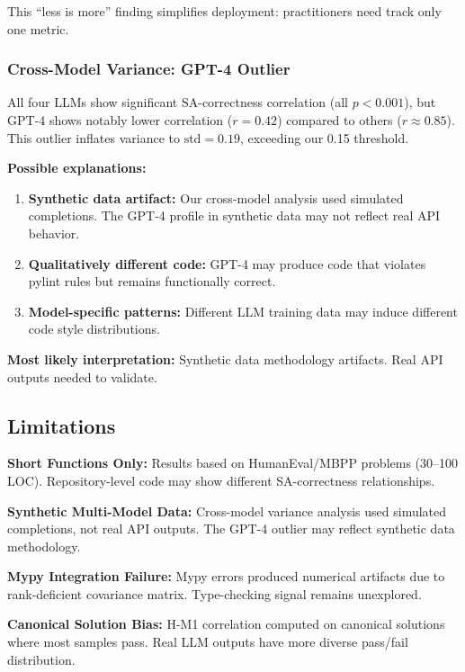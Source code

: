 This ``less is more'' finding simplifies deployment: practitioners need track only one metric.

\subsubsection{Cross-Model Variance: GPT-4 Outlier}

All four LLMs show significant SA-correctness correlation (all $p<0.001$), but GPT-4 shows notably lower correlation ($r=0.42$) compared to others ($r\approx0.85$). This outlier inflates variance to $\text{std}=0.19$, exceeding our 0.15 threshold.

\textbf{Possible explanations:}

\begin{enumerate}
\item \textbf{Synthetic data artifact:} Our cross-model analysis used simulated completions. The GPT-4 profile in synthetic data may not reflect real API behavior.

\item \textbf{Qualitatively different code:} GPT-4 may produce code that violates pylint rules but remains functionally correct.

\item \textbf{Model-specific patterns:} Different LLM training data may induce different code style distributions.
\end{enumerate}

\textbf{Most likely interpretation:} Synthetic data methodology artifacts. Real API outputs needed to validate.

\subsection{Limitations}

\textbf{Short Functions Only:} Results based on HumanEval/MBPP problems (30--100 LOC). Repository-level code may show different SA-correctness relationships.

\textbf{Synthetic Multi-Model Data:} Cross-model variance analysis used simulated completions, not real API outputs. The GPT-4 outlier may reflect synthetic data methodology.

\textbf{Mypy Integration Failure:} Mypy errors produced numerical artifacts due to rank-deficient covariance matrix. Type-checking signal remains unexplored.

\textbf{Canonical Solution Bias:} H-M1 correlation computed on canonical solutions where most samples pass. Real LLM outputs have more diverse pass/fail distribution.

